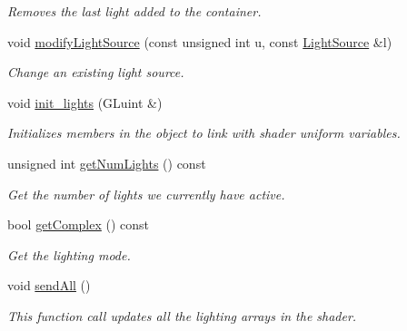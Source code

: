 \begin{DoxyCompactItemize}
\begin{DoxyCompactList}\small\item\em Removes the last light added to the container. \end{DoxyCompactList}\item 
void \hyperlink{class_lights_aaad7e3eb032a41ff4b60e3d0111d1031}{modify\-Light\-Source} (const unsigned int u, const \hyperlink{class_light_source}{Light\-Source} \&l)
\begin{DoxyCompactList}\small\item\em Change an existing light source. \end{DoxyCompactList}\item 
void \hyperlink{class_lights_addf8591af07eae51044c341a8e27959f}{init\-\_\-lights} (G\-Luint \&)
\begin{DoxyCompactList}\small\item\em Initializes members in the object to link with shader uniform variables. \end{DoxyCompactList}\item 
\hypertarget{class_lights_ae9b01f6463a6687c5300486878d61043}{unsigned int \hyperlink{class_lights_ae9b01f6463a6687c5300486878d61043}{get\-Num\-Lights} () const }\label{class_lights_ae9b01f6463a6687c5300486878d61043}

\begin{DoxyCompactList}\small\item\em Get the number of lights we currently have active. \end{DoxyCompactList}\item 
\hypertarget{class_lights_ac02fbea7a66a779bbdfa3be5d2b8a8dc}{bool \hyperlink{class_lights_ac02fbea7a66a779bbdfa3be5d2b8a8dc}{get\-Complex} () const }\label{class_lights_ac02fbea7a66a779bbdfa3be5d2b8a8dc}

\begin{DoxyCompactList}\small\item\em Get the lighting mode. \end{DoxyCompactList}\item 
void \hyperlink{class_lights_ab420d662b1c8425636e711d947614b15}{send\-All} ()
\begin{DoxyCompactList}\small\item\em This function call updates all the lighting arrays in the shader. \end{DoxyCompactList}\end{DoxyCompactItemize}
